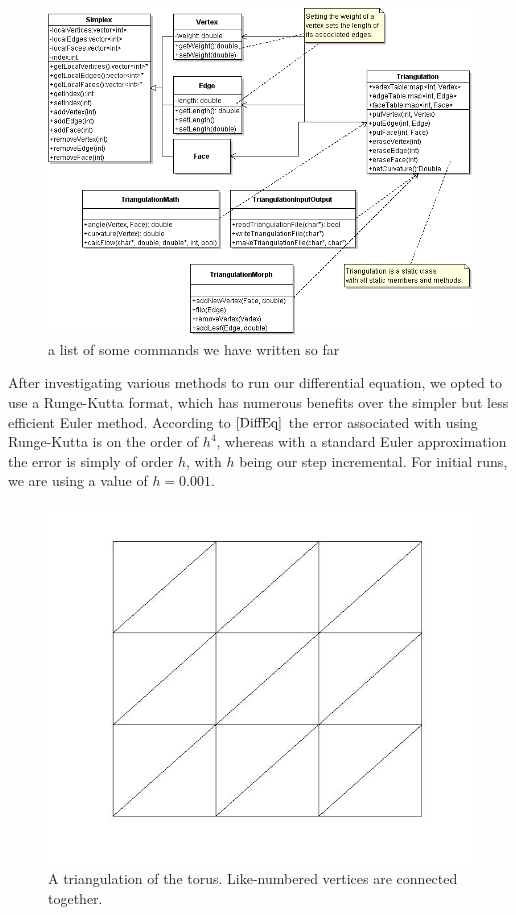 \documentclass[12pt]{article}
\begin{document}
 
\begin{figure}
\includegraphics[scale = 0.5]{triangulationUML.png}
\caption{a list of some commands we have written so far}
\end{figure}

\noindent After investigating various methods to run our differential equation, we opted to use a Runge-Kutta format, which has numerous benefits over the simpler but less efficient Euler method. According to $\cite{DiffEq}$ the error associated with using Runge-Kutta is on the order of $h^4$, whereas with a standard Euler approximation the error is simply of order $h$, with $h$ being our step incremental. For initial runs, we are using a value of $h = 0.001$.\newline
  
  \begin{figure}
  \includegraphics[scale = 0.4]{torus2.jpg}
  \caption{A triangulation of the torus. Like-numbered vertices are connected together.}
  \end{figure}
  
\end{document}
